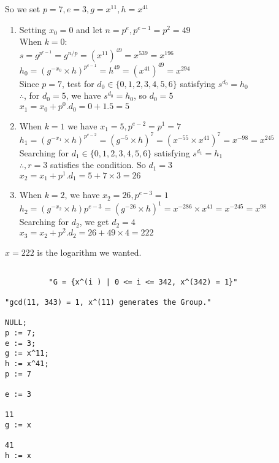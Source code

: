 \documentclass[11pt,a4paper,fleqn]{article}
\begin{document}
\begin{enumerate}[1.]
\begin{flushleft}
\begin{enumerate}
				So we set $p = 7, e = 3, g = x^{11}, h = x^{41}$
				\begin{enumerate}[Step 1.]
					\item Setting $x_0 = 0$ and let $n = p^e, p^{e-1} = p^2 = 49 $\\
					When $k = 0$:\\
					$s = g^{p^{e-1}} = g^{n/p} = (x^{11})^{49} = x^{539} = x^{196}$\\
					$h_0 = (g^{-x_0} \times h)^{p^{e-1}} = h^{49} = (x^{41})^{49} = x^{294}$ \\
					Since $p = 7$, test for $d_0 \in \{0, 1, 2, 3, 4, 5, 6\}$ satisfying $s^{d_0} = h_0$\\
					$\therefore$, for $d_0 = 5$, we have $s^{d_0} = h_0$, so $d_0 = 5$\\
					$x_1 = x_0 + p^0.d_0 = 0 + 1.5 = 5$
					\item When $k = 1$ we have $x_1 = 5, p^{e-2} = p^1 = 7$\\
					$h_1 = (g^{-x_1}\times h)^{p^{e-2}} = (g^{-5}\times h)^7 = (x^{-55} \times x^{41})^7 = x^{-98} = x^{245}$\\
					Searching for $d_1 \in \{0, 1, 2, 3, 4, 5, 6\}$ satisfying $s^{d_1} = h_1$\\
					$\therefore, r = 3$ satisfies the condition. So $d_1 = 3$\\
					$x_2 = x_1 + p^1.d_1 = 5 + 7 \times 3 = 26$\\
					\item When $k = 2$, we have $x_2 = 26, p^{e-3} = 1$\\
					$h_2 = (g^{-x_2} \times h)p^{e-3} = (g^{-26} \times h)^1 = x^{-286} \times x^{41} = x^{-245} = x^{98}$\\
					Searching for $d_2$, we get $d_2 = 4$\\
					$x_3 = x_2 + p^2.d_2 = 26 + 49 \times 4 = 222$  
				\end{enumerate}
				$x = 222$ is the logarithm we wanted.
			\end{enumerate}
			
			\begin{verbatim}
				
          "G = {x^(i ) | 0 <= i <= 342, x^(342) = 1}"

"gcd(11, 343) = 1, x^(11) generates the Group."

NULL;
p := 7;
e := 3;
g := x^11;
h := x^41;
p := 7

e := 3

11
g := x  

41
h := x  



\end{verbatim}
\end{flushleft}
\end{enumerate}
\end{document}
